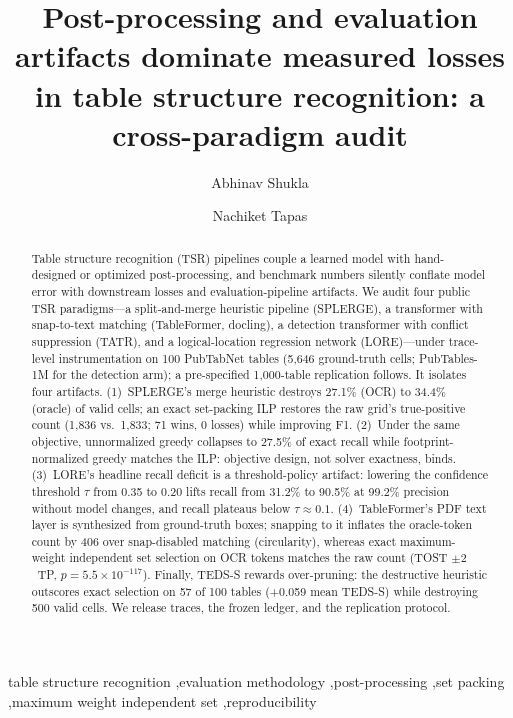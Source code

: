 \documentclass[final,5p,times,twocolumn]{elsarticle}
\begin{document}
\begin{frontmatter}

\title{Post-processing and evaluation artifacts dominate measured losses in table
       structure recognition: a cross-paradigm audit}

\author[a]{Abhinav Shukla}
\author[a]{Nachiket Tapas}

\begin{abstract}
Table structure recognition (TSR) pipelines couple a learned model with
hand-designed or optimized post-processing, and benchmark numbers silently
conflate model error with downstream losses and evaluation-pipeline artifacts. We audit four public TSR paradigms---a
split-and-merge heuristic pipeline (SPLERGE), a transformer with snap-to-text
matching (TableFormer, docling), a detection
transformer with conflict suppression (TATR), and a logical-location
regression network (LORE)---under trace-level instrumentation on 100 PubTabNet
tables (5{,}646 ground-truth cells; PubTables-1M for the detection
arm); a pre-specified 1{,}000-table replication
follows. It isolates four artifacts. (1)~SPLERGE's merge heuristic
destroys 27.1\% (OCR) to 34.4\% (oracle) of valid cells; an exact
set-packing ILP restores the raw grid's true-positive count (1{,}836
vs.\ 1{,}833; 71 wins, 0 losses) while improving
F1. (2)~Under the same objective, unnormalized greedy collapses
to 27.5\% of exact recall while footprint-normalized greedy matches the ILP:
objective design, not solver exactness, binds. (3)~LORE's headline recall
deficit is a threshold-policy artifact: lowering the confidence threshold
$\tau$ from 0.35 to 0.20 lifts recall from 31.2\% to 90.5\% at 99.2\%
precision without model changes, and recall plateaus below
$\tau{\approx}0.1$. (4)~TableFormer's PDF text layer is synthesized from ground-truth boxes;
snapping to it inflates the oracle-token count by 406 over
snap-disabled matching (circularity), whereas exact maximum-weight independent set selection on OCR
tokens matches the raw count (TOST $\pm 2$~TP,
$p=5.5\times 10^{-117}$). Finally, TEDS-S rewards over-pruning: the destructive heuristic
outscores exact selection on 57 of 100 tables (+0.059 mean TEDS-S) while
destroying 500 valid cells. We release traces, the frozen ledger, and the replication protocol.
\end{abstract}

\begin{keyword}
table structure recognition \sep evaluation methodology \sep post-processing
\sep set packing \sep maximum weight independent set \sep reproducibility
\end{keyword}

\end{frontmatter}
\end{document}
